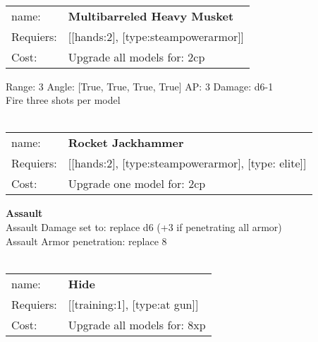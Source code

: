 \ \\
\begin{tabular}{ll}
name: & {\bf Multibarreled Heavy Musket } \\
Requiers: & [[hands:2], [type:steampowerarmor]] \\
Cost: & Upgrade all models for: 2cp \\
\end{tabular}



Range: 3  Angle: [True, True, True, True] AP: 3 Damage: d6-1 \\
Fire three shots per model\\ 








\ \\
\begin{tabular}{ll}
name: & {\bf Rocket Jackhammer } \\
Requiers: & [[hands:2], [type:steampowerarmor], [type: elite]] \\
Cost: & Upgrade one model for: 2cp \\
\end{tabular}





{\bf Assault} \ \\
Assault Damage set to: replace d6 (+3 if penetrating all armor)
\\ 
Assault Armor penetration: replace 8 
\\ 




\ \\
\begin{tabular}{ll}
name: & {\bf Hide } \\
Requiers: & [[training:1], [type:at gun]] \\
Cost: & Upgrade all models for: 8xp \\
\end{tabular}


